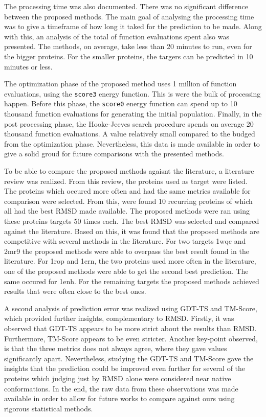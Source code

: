 The processing time was also documented. There was no significant difference
between the proposed methods. The main goal of analysing the processing time was
to give a timeframe of how long it taked for the prediction to be made. Along
with this, an analysis of the total of function evaluations spent also was
presented. The methods, on average, take less than 20 minutes to run, even for
the bigger proteins. For the smaller proteins, the targers can be predicted in
10 minutes or less.

The optimization phase of the proposed method uses 1 million of function
evaluations, using the \texttt{score3} energy function. This is were the bulk
of processing happen. Before this phase, the \texttt{score0} energy function
can spend up to 10 thousand function evaluations for generating the initial
population. Finally, in the post processing phase, the Hooke-Jeeves search
procedure spends on average 20 thousand function evaluations. A value relatively
small compared to the budged from the optimization phase. Nevertheless, this
data is made available in order to give a solid groud for future comparisons
with the presented methods.

To be able to compare the proposed methods agaisnt the literature, a literature
review was realized. From this review, the proteins used as target were listed.
The proteins which occured more often and had the same metrics available for
comparison were selected. From this, were found 10 recurring proteins of which
all had the best RMSD made available. The proposed methods were ran using these
proteins targets 50 times each. The best RMSD was selected and compared against
the literature. Based on this, it was found that the proposed methods are
competitive with several methods in the literature. For two targets 1wqc and
2mr9 the proposed methods were able to overpass the best result found in the
literature. For 1rop and 1crn, the two proteins used more often in the
literature, one of the proposed methods were able to get the second best
prediction. The same occured for 1enh. For the remaining targets the proposed
methods achieved results that were often close to the best ones.

A second analysis of prediction error was realized using GDT-TS and TM-Score,
which provided further insights, complementary to RMSD. Firstly, it was observed
that GDT-TS appears to be more strict about the results than RMSD. Furthermore,
TM-Score appears to be even stricter. Another key-point observed, is that the
three metrics does not always agree, where they gave values significantly
apart. Nevertheless, studying the GDT-TS and TM-Score gave the insights that
the prediction could be improved even further for several of the proteins which
judging just by RMSD alone were considered near native conformations. In the end,
the raw data from these observations was made available in order to allow for
future works to compare against ours using rigorous statistical methods.

